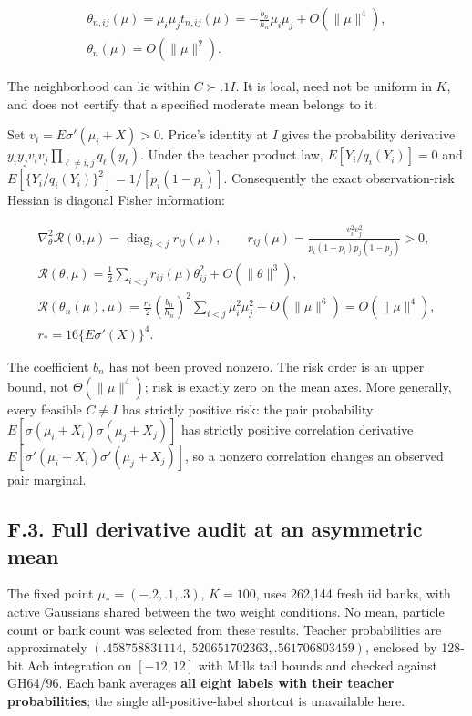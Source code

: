\documentclass{article}
\begin{document}
\[
\begin{gathered}
\theta_{n,ij}(\mu)=\mu_i\mu_jt_{n,ij}(\mu)
=-\frac{b_n}{h_n}\mu_i\mu_j+O(\|\mu\|^4),\\
\theta_n(\mu)=O(\|\mu\|^2).
\end{gathered}
\tag{F.5}
\]

The neighborhood can lie within \(C\succ.1I\). It is local, need not be
uniform in \(K\), and does not certify that a specified moderate mean
belongs to it.

Set \(v_i=E\sigma'(\mu_i+X)>0\). Price's identity at \(I\) gives the
probability derivative
\(y_iy_jv_iv_j\prod_{\ell\ne i,j}q_\ell(y_\ell)\). Under the teacher
product law, \(E[Y_i/q_i(Y_i)]=0\) and
\(E[\{Y_i/q_i(Y_i)\}^2]=1/[p_i(1-p_i)]\). Consequently the exact
observation-risk Hessian is diagonal Fisher information:

\[
\begin{gathered}
\nabla_\theta^2\mathcal R(0,\mu)=\operatorname{diag}_{i<j}r_{ij}(\mu),\qquad
r_{ij}(\mu)=\frac{v_i^2v_j^2}{p_i(1-p_i)p_j(1-p_j)}>0,\\
\mathcal R(\theta,\mu)=\frac12\sum_{i<j}r_{ij}(\mu)\theta_{ij}^2+O(\|\theta\|^3),\\
\mathcal R(\theta_n(\mu),\mu)
=\frac{r_*}{2}\left(\frac{b_n}{h_n}\right)^2\sum_{i<j}\mu_i^2\mu_j^2
+O(\|\mu\|^6)=O(\|\mu\|^4),\\
r_*=16\{E\sigma'(X)\}^4.
\end{gathered}
\tag{F.6}
\]

The coefficient \(b_n\) has not been proved nonzero. The risk order is
an upper bound, not \(\Theta(\|\mu\|^4)\); risk is exactly zero on the
mean axes. More generally, every feasible \(C\ne I\) has strictly
positive risk: the pair probability
\(E[\sigma(\mu_i+X_i)\sigma(\mu_j+X_j)]\) has strictly positive
correlation derivative \(E[\sigma'(\mu_i+X_i)\sigma'(\mu_j+X_j)]\), so a
nonzero correlation changes an observed pair marginal.

\subsection*{F.3. Full derivative audit at an asymmetric
mean}\label{f.3.-full-derivative-audit-at-an-asymmetric-mean}

The fixed point \(\mu_*=(-.2,.1,.3)\), \(K=100\), uses 262,144 fresh iid
banks, with active Gaussians shared between the two weight conditions.
No mean, particle count or bank count was selected from these results.
Teacher probabilities are approximately
\((.458758831114,.520651702363,.561706803459)\), enclosed by 128-bit Acb
integration on \([-12,12]\) with Mills tail bounds and checked against
GH64/96. Each bank averages \textbf{all eight labels with their teacher
probabilities}; the single all-positive-label shortcut is unavailable
here.
\end{document}
